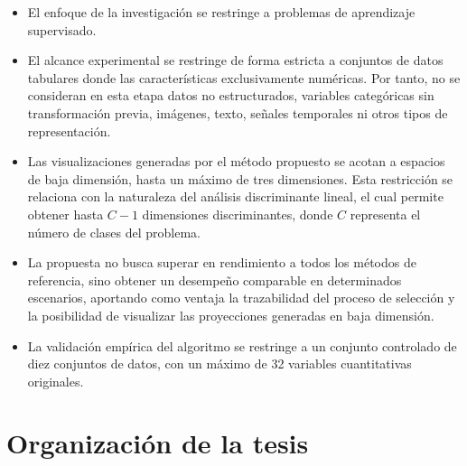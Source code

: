 \begin{itemize}
	
	\item El enfoque de la investigación se restringe a problemas de aprendizaje supervisado.
	
	\item El alcance experimental se restringe de forma estricta a conjuntos de datos tabulares donde las características exclusivamente numéricas. Por tanto, no se consideran en esta etapa datos no estructurados, variables categóricas sin transformación previa, imágenes, texto, señales temporales ni otros tipos de representación.
	
	\item Las visualizaciones generadas por el método propuesto se acotan a espacios de baja dimensión, hasta un máximo de tres dimensiones. Esta restricción se relaciona con la naturaleza del análisis discriminante lineal, el cual permite obtener hasta $C - 1$ dimensiones discriminantes, donde $C$ representa el número de clases del problema.
	
	\item La propuesta no busca superar en rendimiento a todos los métodos de referencia, sino obtener un desempeño comparable en determinados escenarios, aportando como ventaja la trazabilidad del proceso de selección y la posibilidad de visualizar las proyecciones generadas en baja dimensión.
	
	\item La validación empírica del algoritmo se restringe a un conjunto controlado de diez conjuntos de datos, con un máximo de 32 variables cuantitativas originales.
	
\end{itemize}

\section{Organización de la tesis}
\label{sec:Organización-Tesis}

